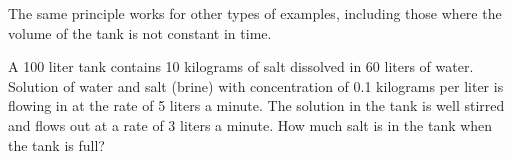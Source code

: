 \documentclass{ximera}
\begin{document}
The same principle works for other types of examples, including those where the volume of the tank is not constant in time. 

\begin{mywrapfigsimp}{1.55in}{1.60in}
    \noindent
    
\end{mywrapfigsimp}

\begin{example}
    A 100 liter tank contains 10 kilograms of salt dissolved in 60 liters of water.  Solution of water and salt (brine) with concentration of 0.1 kilograms per liter is flowing in at the rate of 5 liters a minute.  The solution in the tank is well stirred and flows out at a rate of 3 liters a minute. How much salt is in the tank when the tank is full?
\end{example}
\end{document}
